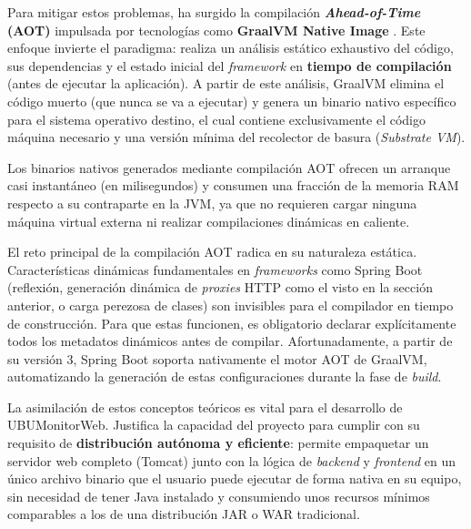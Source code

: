 Para mitigar estos problemas, ha surgido la compilación \textbf{\textit{Ahead-of-Time} (AOT)} impulsada por tecnologías como \textbf{GraalVM Native Image} \cite{graalvm}. Este enfoque invierte el paradigma: realiza un análisis estático exhaustivo del código, sus dependencias y el estado inicial del \textit{framework} en \textbf{tiempo de compilación} (antes de ejecutar la aplicación). A partir de este análisis, GraalVM elimina el código muerto (que nunca se va a ejecutar) y genera un binario nativo específico para el sistema operativo destino, el cual contiene exclusivamente el código máquina necesario y una versión mínima del recolector de basura (\textit{Substrate VM}).

Los binarios nativos generados mediante compilación AOT ofrecen un arranque casi instantáneo (en milisegundos) y consumen una fracción de la memoria RAM respecto a su contraparte en la JVM, ya que no requieren cargar ninguna máquina virtual externa ni realizar compilaciones dinámicas en caliente.

El reto principal de la compilación AOT radica en su naturaleza estática. Características dinámicas fundamentales en \textit{frameworks} como Spring Boot (reflexión, generación dinámica de \textit{proxies} HTTP como el visto en la sección anterior, o carga perezosa de clases) son invisibles para el compilador en tiempo de construcción. Para que estas funcionen, es obligatorio declarar explícitamente todos los metadatos dinámicos antes de compilar. Afortunadamente, a partir de su versión 3, Spring Boot soporta nativamente el motor AOT de GraalVM, automatizando la generación de estas configuraciones durante la fase de \textit{build}.

La asimilación de estos conceptos teóricos es vital para el desarrollo de UBUMonitorWeb. Justifica la capacidad del proyecto para cumplir con su requisito de \textbf{distribución autónoma y eficiente}: permite empaquetar un servidor web completo (Tomcat) junto con la lógica de \textit{backend} y \textit{frontend} en un único archivo binario que el usuario puede ejecutar de forma nativa en su equipo, sin necesidad de tener Java instalado y consumiendo unos recursos mínimos comparables a los de una distribución JAR o WAR tradicional.
